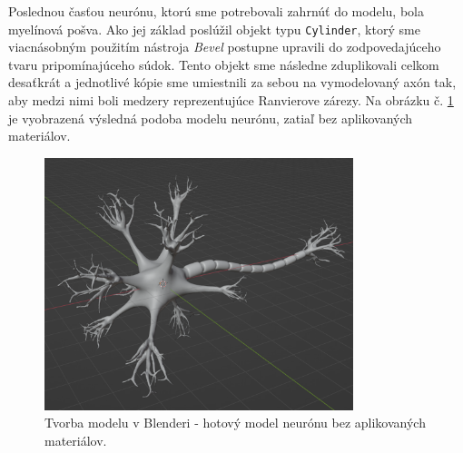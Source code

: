 Poslednou časťou neurónu, ktorú sme potrebovali zahrnúť do modelu, bola myelínová pošva. Ako jej základ poslúžil objekt typu \texttt{Cylinder}, ktorý sme viacnásobným použitím nástroja \emph{Bevel} postupne
upravili do zodpovedajúceho tvaru pripomínajúceho súdok. Tento objekt sme následne zduplikovali celkom desaťkrát a jednotlivé kópie sme umiestnili za sebou na vymodelovaný axón tak, aby medzi 
nimi boli medzery reprezentujúce Ranvierove zárezy. Na obrázku č. \ref{blender5} je vyobrazená výsledná podoba modelu neurónu, zatiaľ bez aplikovaných materiálov.
 
\begin{figure}[!htbp]
  \centering
  \includegraphics[width=9cm]{img/finalModel-crop.png}
  \caption{Tvorba modelu v Blenderi - hotový model neurónu bez aplikovaných materiálov.}
  \label{blender5}
\end{figure}